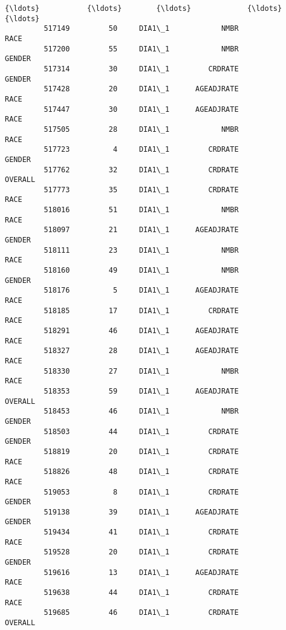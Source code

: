 \documentclass[11pt]{article}
\begin{document}
\begin{Verbatim}[commandchars=\\\{\}]
         {\ldots}           {\ldots}        {\ldots}             {\ldots}                        {\ldots}   
         517149         50     DIA1\_1            NMBR                       RACE   
         517200         55     DIA1\_1            NMBR                     GENDER   
         517314         30     DIA1\_1         CRDRATE                     GENDER   
         517428         20     DIA1\_1      AGEADJRATE                       RACE   
         517447         30     DIA1\_1      AGEADJRATE                       RACE   
         517505         28     DIA1\_1            NMBR                       RACE   
         517723          4     DIA1\_1         CRDRATE                     GENDER   
         517762         32     DIA1\_1         CRDRATE                    OVERALL   
         517773         35     DIA1\_1         CRDRATE                       RACE   
         518016         51     DIA1\_1            NMBR                       RACE   
         518097         21     DIA1\_1      AGEADJRATE                     GENDER   
         518111         23     DIA1\_1            NMBR                       RACE   
         518160         49     DIA1\_1            NMBR                     GENDER   
         518176          5     DIA1\_1      AGEADJRATE                       RACE   
         518185         17     DIA1\_1         CRDRATE                       RACE   
         518291         46     DIA1\_1      AGEADJRATE                       RACE   
         518327         28     DIA1\_1      AGEADJRATE                       RACE   
         518330         27     DIA1\_1            NMBR                       RACE   
         518353         59     DIA1\_1      AGEADJRATE                    OVERALL   
         518453         46     DIA1\_1            NMBR                     GENDER   
         518503         44     DIA1\_1         CRDRATE                     GENDER   
         518819         20     DIA1\_1         CRDRATE                       RACE   
         518826         48     DIA1\_1         CRDRATE                       RACE   
         519053          8     DIA1\_1         CRDRATE                     GENDER   
         519138         39     DIA1\_1      AGEADJRATE                     GENDER   
         519434         41     DIA1\_1         CRDRATE                       RACE   
         519528         20     DIA1\_1         CRDRATE                     GENDER   
         519616         13     DIA1\_1      AGEADJRATE                       RACE   
         519638         44     DIA1\_1         CRDRATE                       RACE   
         519685         46     DIA1\_1         CRDRATE                    OVERALL   
         

\end{Verbatim}
\end{document}
